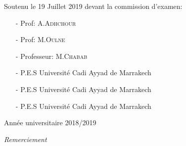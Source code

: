 \documentclass[12pt,  a4paper, openright]{report} %
\begin{document}
\begin{titlepage}
\begin{center}
\begin{Large}
\begin{minipage}[b]{0.45\linewidth}
\begin{flushright}
\begin{tabular}{l}
					\end{tabular}
					
				\end{flushright}   
			\end{minipage}\hfill
			
			
			
		\end{Large}
		
		
		\vspace{0.5cm}
		
	\end{center}
	\begin{flushleft}
		Soutenu le 19  Juillet 2019 devant la commission d'examen:\\ \vspace{1cm}
		
		\begin{minipage}{0.45\linewidth}
			\begin{itemize}
				\item[-] Prof:  \textsc{A.Adhchour}
				\item[-] Prof:  \textsc{M.Oulne}
				\item[-] Professeur:  \textsc{M.Chabab}
				
			\end{itemize}
		\end{minipage}\hfill
		\begin{minipage}{0.55\linewidth}
			\begin{itemize}
				\item[-] P.E.S Université Cadi Ayyad de Marrakech
				\item[-] P.E.S Université Cadi Ayyad de Marrakech
				\item[-] P.E.S Université Cadi Ayyad de Marrakech
				
			\end{itemize} 	     
		\end{minipage}
		
		
	\end{flushleft}
	\vspace{0.8cm}
	\begin{center}
		Année universitaire 2018/2019
	\end{center}
\end{titlepage}

\newpage
\begin{center}
\begin{LARGE}
	\textit{Remerciement\vspace*{2cm}}\\
\end{LARGE}

\end{center}
\end{document}
